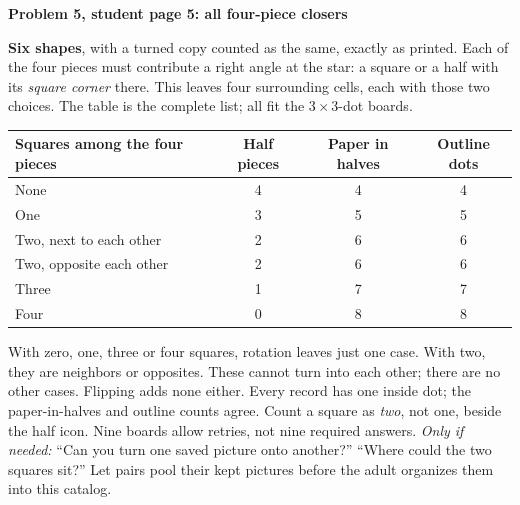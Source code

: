 \documentclass[11pt]{article}
\newcommand{\sub}[1]{\par\textbf{#1}\par}
\newcommand{\hint}[1]{\textit{Only if needed:} #1}
\newcommand{\closer}[4]{%
  \foreach \r/\full in {0/#1,90/#2,180/#3,270/#4}{%
    \begin{scope}[rotate=\r]
      \ifnum\full=1\filldraw[fill=gray!18] (0,0) rectangle (1,1);
      \else\filldraw[fill=gray!18] (0,0)--(1,0)--(0,1)--cycle;\fi
    \end{scope}}
  \foreach \x in {-1,0,1}{\foreach \y in {-1,0,1}{\fill (\x,\y) circle (1.1pt);}}
  \draw (-.13,-.13) rectangle (.13,.13);}
\begin{document}
\sub{Problem 5, student page 5: all four-piece closers}
\textbf{Six shapes}, with a turned copy counted as the same, exactly as printed. Each of the four pieces must contribute a right angle at the star: a square or a half with its \emph{square corner} there. This leaves four surrounding cells, each with those two choices. The table is the complete list; all fit the $3\times3$-dot boards.
\begin{center}
\renewcommand{\arraystretch}{1.16}
\begin{tabular}{lccc}
Squares among the four pieces & Half pieces & Paper in halves & Outline dots\\\midrule
None & 4 & 4 & 4\\
One & 3 & 5 & 5\\
Two, next to each other & 2 & 6 & 6\\
Two, opposite each other & 2 & 6 & 6\\
Three & 1 & 7 & 7\\
Four & 0 & 8 & 8
\end{tabular}

\vspace{3mm}
\end{center}
With zero, one, three or four squares, rotation leaves just one case. With two, they are neighbors or opposites. These cannot turn into each other; there are no other cases. Flipping adds none either. Every record has one inside dot; the paper-in-halves and outline counts agree. Count a square as \emph{two}, not one, beside the half icon. Nine boards allow retries, not nine required answers. \hint{``Can you turn one saved picture onto another?'' ``Where could the two squares sit?''} Let pairs pool their kept pictures before the adult organizes them into this catalog.
\end{document}
